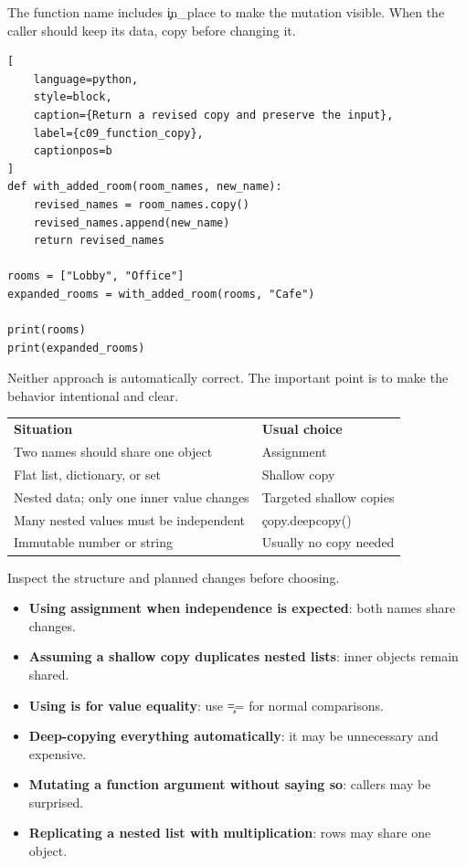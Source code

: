 The function name includes \c{in_place} to make the mutation visible. When the
caller should keep its data, copy before changing it.

\begin{lstlisting}[
    language=python,
    style=block,
    caption={Return a revised copy and preserve the input},
    label={c09_function_copy},
    captionpos=b
]
def with_added_room(room_names, new_name):
    revised_names = room_names.copy()
    revised_names.append(new_name)
    return revised_names

rooms = ["Lobby", "Office"]
expanded_rooms = with_added_room(rooms, "Cafe")

print(rooms)
print(expanded_rooms)
\end{lstlisting}

Neither approach is automatically correct. The important point is to make the
behavior intentional and clear.


\begin{center}
\begin{tabular}{ll}
\textbf{Situation} & \textbf{Usual choice} \\
Two names should share one object & Assignment \\
Flat list, dictionary, or set & Shallow copy \\
Nested data; only one inner value changes & Targeted shallow copies \\
Many nested values must be independent & \c{copy.deepcopy()} \\
Immutable number or string & Usually no copy needed \\
\end{tabular}
\end{center}

Inspect the structure and planned changes before choosing.


\begin{itemize}
    \item \textbf{Using assignment when independence is expected}: both names share changes.
    \item \textbf{Assuming a shallow copy duplicates nested lists}: inner objects remain shared.
    \item \textbf{Using is for value equality}: use \c{==} for normal comparisons.
    \item \textbf{Deep-copying everything automatically}: it may be unnecessary and expensive.
    \item \textbf{Mutating a function argument without saying so}: callers may be surprised.
    \item \textbf{Replicating a nested list with multiplication}: rows may share one object.
\end{itemize}


